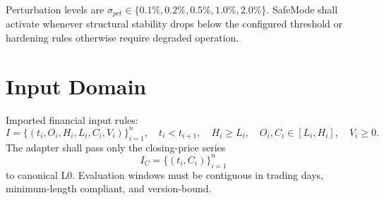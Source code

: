 Perturbation levels are $\sigma_{pct}\in\{0.1\%,0.2\%,0.5\%,1.0\%,2.0\%\}$. SafeMode shall activate whenever structural stability drops below the configured threshold or hardening rules otherwise require degraded operation.

\section{Input Domain}

Imported financial input rules:
\[
I = \{(t_i,O_i,H_i,L_i,C_i,V_i)\}_{i=1}^{n},\quad t_i<t_{i+1},\quad H_i\ge L_i,\quad O_i,C_i\in[L_i,H_i],\quad V_i\ge 0.
\]
The adapter shall pass only the closing-price series
\[
I_C = \{(t_i,C_i)\}_{i=1}^{n}
\]
to canonical L0. Evaluation windows must be contiguous in trading days, minimum-length compliant, and version-bound.
